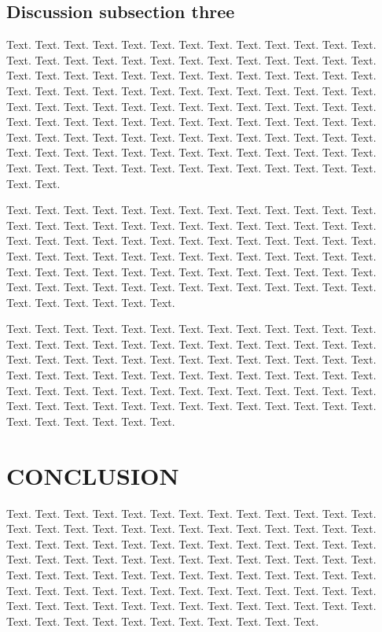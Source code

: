 \documentclass[a4,center,fleqn]{NAR}
\begin{document}
\subsection{Discussion subsection three}

Text. Text. Text. Text. Text. Text. Text. Text. Text. Text. Text.
Text. Text. Text. Text. Text. Text. Text. Text. Text. Text. Text.
Text. Text. Text. Text. Text. Text. Text. Text. Text. Text. Text.
Text. Text. Text. Text. Text. Text. Text. Text. Text. Text. Text.
Text. Text. Text. Text. Text. Text. Text. Text. Text. Text. Text.
Text. Text. Text. Text. Text. Text. Text. Text. Text. Text. Text.
Text. Text. Text. Text. Text. Text. Text. Text. Text. Text. Text.
Text. Text. Text. Text. Text. Text. Text. Text. Text. Text. Text.
Text. Text. Text. Text. Text. Text. Text. Text. Text. Text. Text.
Text. Text. Text. Text. Text. Text. Text. Text. Text. Text. Text.
Text. Text. Text. Text. Text. Text. Text. Text. Text.

Text. Text. Text. Text. Text. Text. Text. Text. Text. Text. Text.
Text. Text. Text. Text. Text. Text. Text. Text. Text. Text. Text.
Text. Text. Text. Text. Text. Text. Text. Text. Text. Text. Text.
Text. Text. Text. Text. Text. Text. Text. Text. Text. Text. Text.
Text. Text. Text. Text. Text. Text. Text. Text. Text. Text. Text.
Text. Text. Text. Text. Text. Text. Text. Text. Text. Text. Text.
Text. Text. Text. Text. Text. Text. Text. Text. Text. Text. Text.
Text. Text. Text. Text. Text. Text. Text.

Text. Text. Text. Text. Text. Text. Text. Text. Text. Text. Text.
Text. Text. Text. Text. Text. Text. Text. Text. Text. Text. Text.
Text. Text. Text. Text. Text. Text. Text. Text. Text. Text. Text.
Text. Text. Text. Text. Text. Text. Text. Text. Text. Text. Text.
Text. Text. Text. Text. Text. Text. Text. Text. Text. Text. Text.
Text. Text. Text. Text. Text. Text. Text. Text. Text. Text. Text.
Text. Text. Text. Text. Text. Text. Text. Text. Text. Text. Text.
Text. Text. Text. Text. Text. Text. Text.


\section{CONCLUSION}

Text. Text. Text. Text. Text. Text. Text. Text. Text. Text. Text.
Text. Text. Text. Text. Text. Text. Text. Text. Text. Text. Text.
Text. Text. Text. Text. Text. Text. Text. Text. Text. Text. Text.
Text. Text. Text. Text. Text. Text. Text. Text. Text. Text. Text.
Text. Text. Text. Text. Text. Text. Text. Text. Text. Text. Text.
Text. Text. Text. Text. Text. Text. Text. Text. Text. Text. Text.
Text. Text. Text. Text. Text. Text. Text. Text. Text. Text. Text.
Text. Text. Text. Text. Text. Text. Text. Text. Text. Text. Text.
Text. Text. Text. Text. Text. Text. Text. Text. Text. Text. Text.
Text. Text. Text.
\end{document}
